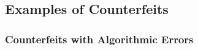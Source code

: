 \subsection{Examples of Counterfeits} \label{appendix:qual-sample-categories}
\subsubsection{Counterfeits with Algorithmic Errors}

